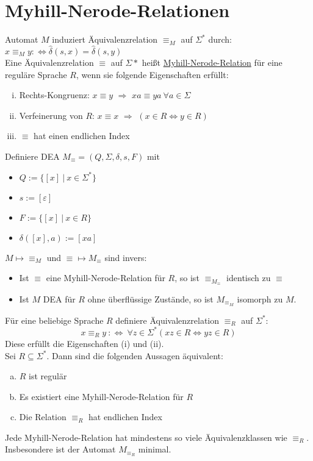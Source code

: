\documentclass[a4paper]{article}
\newcommand{\ul}{\underline}
\let\epsilon\varepsilon
\begin{document}
\section{Myhill-Nerode-Relationen}
Automat $M$ induziert Äquivalenzrelation $\equiv_M$ auf $\Sigma^*$ durch: $x\equiv_M y:\Leftrightarrow\hat{\delta}(s,x)=\hat{\delta}(s,y)$\\
Eine Äquivalenzrelation $\equiv$ auf $\Sigma*$ heißt \ul{Myhill-Nerode-Relation} für eine reguläre Sprache $R$, wenn sie folgende Eigenschaften erfüllt:
\begin{enumerate}[(i)]
	\item Rechts-Kongruenz: $x\equiv y$ $\Rightarrow$ $xa\equiv ya\ \forall a\in\Sigma$
	\item Verfeinerung von $R$: $x\equiv x$ $\Rightarrow$ $(x\in R\Leftrightarrow y\in R)$
	\item $\equiv$ hat einen endlichen Index
\end{enumerate}
Definiere DEA $M_\equiv=(Q,\Sigma,\delta,s,F)$ mit
\begin{itemize}
	\item $Q:=\{\left[x\right]\ \vert\ x\in\Sigma^*\}$
	\item $s:=\left[\epsilon\right]$
	\item $F:=\{\left[x\right]\ \vert\ x\in R\}$
	\item $\delta(\left[x\right],a):=\left[xa\right]$
\end{itemize}
$M\mapsto \equiv_M$ und $\equiv\mapsto M_\equiv$ sind invers:
\begin{itemize}
	\item Ist $\equiv$ eine Myhill-Nerode-Relation für $R$, so ist $\equiv_{M_\equiv}$ identisch zu $\equiv$
	\item Ist $M$ DEA für $R$ ohne überflüssige Zustände, so ist $M_{\equiv_M}$ isomorph zu $M$.
\end{itemize}
Für eine beliebige Sprache $R$ definiere Äquivalenzrelation $\equiv_R$ auf $\Sigma^*$: $$x\equiv_R y\ :\Leftrightarrow\ \forall z\in\Sigma^*(xz\in R\Leftrightarrow yz\in R)$$
Diese erfüllt die Eigenschaften (i) und (ii).\\
Sei $R\subseteq\Sigma^*$. Dann sind die folgenden Aussagen äquivalent:
\begin{enumerate}[(a)]
	\item $R$ ist regulär
	\item Es existiert eine Myhill-Nerode-Relation für $R$
	\item Die Relation $\equiv_R$ hat endlichen Index
\end{enumerate}
Jede Myhill-Nerode-Relation hat mindestens so viele Äquivalenzklassen wie $\equiv_R$. Insbesondere ist der Automat $M_{\equiv_R}$ minimal.
\end{document}
